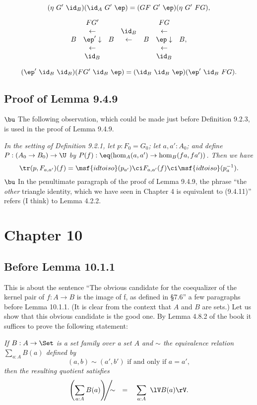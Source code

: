 \documentclass[12pt]{article}
\begin{document}
$$
(\eta\ G'\ \id_B)(\id_A\ G'\ \ep)=(GF\ G'\ \ep)(\eta\ G'\ FG),
$$

$$
\begin{array}{ccccccc}
&FG'&&&&FG\\
&\leftarrow&&\id_B&&\leftarrow\\
B&\ep'\downarrow&B&\leftarrow&B&\ep\downarrow&B,\\
&\leftarrow&&&&\leftarrow\\
&\id_B&&&&\id_B
\end{array}
$$

$$
(\ep'\ \id_B\ \id_B)(FG'\ \id_B\ \ep)=(\id_B\ \id_B\ \ep)(\ep'\ \id_B\ FG).
$$


\subsection{Proof of Lemma 9.4.9}

$\bu$ The following observation, which could be made just before Definition 9.2.3, is used in the proof of Lemma 9.4.9.

\emph{In the setting of Definition 9.2.1, let $p:F_0=G_0$; let $a,a':A_0$; and define $P:(A_0\to B_0)\to\U$ by $P(f):\eq(\hom_A(a,a')\to\hom_B(fa,fa'))$. Then we have} 
$$
\tr(p,F_{a,a'})(f)=\msf{idtoiso}(p_{a'})\ci F_{a,a'}(f)\ci\msf{idtoiso}(p_a^{-1}).
$$ 
$\bu$ In the penultimate paragraph of the proof of Lemma 9.4.9, the phrase ``the \emph{other} triangle identity, which we have seen in Chapter 4 is equivalent to (9.4.11)'' refers (I think) to Lemma 4.2.2.


\section{Chapter 10}

\subsection{Before Lemma 10.1.1}

This is about the sentence ``The obvious candidate for the coequalizer of the kernel pair of $f:A\to B$ is the image of f, as defined in \S7.6'' a few paragraphs before Lemma 10.1.1. (It is clear from the context that $A$ and $B$ are sets.) Let us show that this obvious candidate is the good one. By Lemma 4.8.2 of the book it suffices to prove the following statement:

\emph{If $B:A\to\Set$ is a set family over a set $A$ and $\sim$ the equivalence relation $\sum_{a:A}B(a)$ defined by 
$$
(a,b)\sim(a',b')\text{ if and only if }a=a',
$$ 
then the resulting quotient satisfies}
$$
\left(\sum_{a:A}B(a)\right)\!\!\!\Bigg/\!\!\!\!\sim\quad=\quad\sum_{a:A}\ \lV B(a)\rV.
$$
\end{document}

